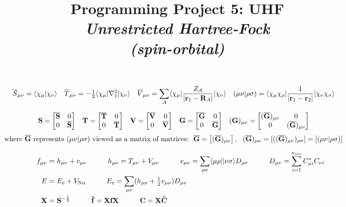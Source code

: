 \documentclass[fleqn]{article}
\title{Programming Project 5: UHF\\
\textit{Unrestricted Hartree-Fock\\(spin-orbital)}}
\author{}
\date{}
\begin{document}
\maketitle

\noindent
{}
\begin{align}
\label{space-ao-ints}
&
  \overline{S}_{\mu\nu}
=
  \langle\chi_{\mu}|\chi_{\nu}\rangle
&&
  \overline{T}_{\mu\nu}
=
  -\tfrac{1}{2}\langle\chi_{\mu}|\nabla_1^2|\chi_{\nu}\rangle
&&
  \overline{V}_{\mu\nu}
=
  \sum_A\langle\chi_{\mu}|\dfrac{Z_A}{|\mathbf{r}_1-\mathbf{R}_A|}|\chi_{\nu}\rangle
&&
  (\mu\nu|\rho\sigma)
=
  \langle\chi_\mu\chi_\rho|\dfrac{1}{|\mathbf{r}_1-\mathbf{r}_2|}|\chi_\nu\chi_\sigma\rangle
\end{align}


\noindent
{}
\begin{align}
\label{spin-ao-ints-1}
&
  \mathbf{S}
=
  \begin{bmatrix}\overline{\mathbf{S}}&0\\0&\overline{\mathbf{S}}\end{bmatrix}
&&
  \mathbf{T}
=
  \begin{bmatrix}\overline{\mathbf{T}}&0\\0&\overline{\mathbf{T}}\end{bmatrix}
&&
  \mathbf{V}
=
  \begin{bmatrix}\overline{\mathbf{V}}&0\\0&\overline{\mathbf{V}}\end{bmatrix}
&&
  \mathbf{G}
=
  \begin{bmatrix}\overline{\mathbf{G}}&0\\0&\overline{\mathbf{G}}\end{bmatrix}
&&
  (\mathbf{G})_{\mu\nu}
=
  \begin{bmatrix}(\overline{\mathbf{G}})_{\mu\nu}&0\\0&(\overline{\mathbf{G}})_{\mu\nu}\end{bmatrix}
\end{align}
\begin{align}
\label{spin-ao-ints-2}
&
\text{where $\ol{\bo{G}}$ represents $(\mu\nu|\rho\si)$ viewed as a matrix of matrices:}
\ \ 
  \ol{\bo{G}}
=
  \ma{(\ol{\bo{G}})_{\mu\nu}},
\ \ 
  (\ol{\bo{G}})_{\mu\nu}
=
  [((\ol{\bo{G}})_{\mu\nu})_{\rho\si}]
=
  [(\mu\nu|\rho\si)]
\end{align}


\noindent
{}
\begin{align}
\label{fock-matrix}
&&
  f_{\mu\nu}
=&\
  h_{\mu\nu}
+
  v_{\mu\nu}
\hspace{30pt}
  h_{\mu\nu}
=
  T_{\mu\nu}+V_{\mu\nu}
\hspace{30pt}
  v_{\mu\nu}
=
  \sum_{\rho\sigma}
  \langle\mu\rho||\nu\sigma\rangle
  D_{\rho\sigma}
\hspace{30pt}
  D_{\mu\nu}
=
  \sum_{i=1}^{n_\text{occ}}
  C_{\mu i}^* C_{\nu i}
\\
\label{energy}
&&
  E
=&\
  E_e
+
  V_\mathrm{Nu}
\hspace{30pt}
  E_e
=
  \sum_{\mu\nu}
  (h_{\mu\nu}+\tfrac{1}{2}v_{\mu\nu})D_{\mu\nu}
\\
\label{orthogonalizer}
&&
  \mathbf{X}
=&\
  \mathbf{S}^{-\frac{1}{2}}
\hspace{30pt}
  \mathbf{\tilde{f}}
=
  \mathbf{X}\mathbf{f}\mathbf{X}
\hspace{30pt}
  \mathbf{C}
=
  \mathbf{X}
  \mathbf{\tilde{C}}
\end{align}
\end{document}
